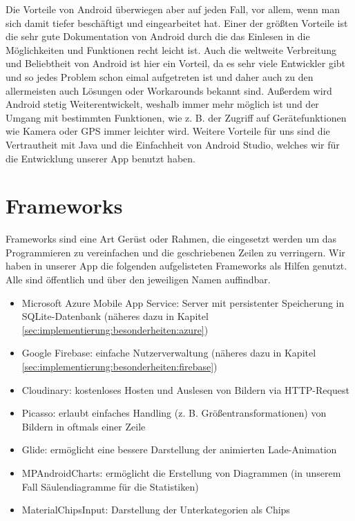 Die Vorteile von Android überwiegen aber auf jeden Fall, vor allem, wenn man sich damit tiefer beschäftigt und eingearbeitet hat. Einer der größten Vorteile ist die sehr gute Dokumentation von Android durch die das Einlesen in die Möglichkeiten und Funktionen recht leicht ist. Auch die weltweite Verbreitung und Beliebtheit von Android ist hier ein Vorteil, da es sehr viele Entwickler gibt und so jedes Problem schon eimal aufgetreten ist und daher auch zu den allermeisten auch Lösungen oder Workarounds bekannt sind.
Außerdem wird Android stetig Weiterentwickelt, weshalb immer mehr möglich ist und der Umgang mit bestimmten Funktionen, wie z. B. der Zugriff auf Gerätefunktionen wie Kamera oder GPS immer leichter wird.
Weitere Vorteile für uns sind die Vertrautheit mit Java und die Einfachheit von Android Studio, welches wir für die Entwicklung unserer App benutzt haben.

\section{Frameworks}
\label{sec:grundlagen:frameworks}
Frameworks sind eine Art Gerüst oder Rahmen, die eingesetzt werden um das Programmieren zu vereinfachen und die geschriebenen Zeilen zu verringern. Wir haben in unserer App die folgenden aufgelisteten Frameworks als Hilfen genutzt. Alle sind öffentlich und über den jeweiligen Namen auffindbar.
\begin{itemize}
\item Microsoft Azure Mobile App Service: Server mit persistenter Speicherung in SQLite-Datenbank (näheres dazu in Kapitel \ref{sec:implementierung:besonderheiten:azure})
\item Google Firebase: einfache Nutzerverwaltung (näheres dazu in Kapitel \ref{sec:implementierung:besonderheiten:firebase})
\item Cloudinary: kostenloses Hosten und Auslesen von Bildern via HTTP-Request
\item Picasso: erlaubt einfaches Handling (z. B. Größentransformationen) von Bildern in oftmals einer Zeile
\item Glide: ermöglicht eine bessere Darstellung der animierten Lade-Animation
\item MPAndroidCharts: ermöglicht die Erstellung von Diagrammen (in unserem Fall Säulendiagramme für die Statistiken)
\item MaterialChipsInput: Darstellung der Unterkategorien als Chips
\end{itemize}



















